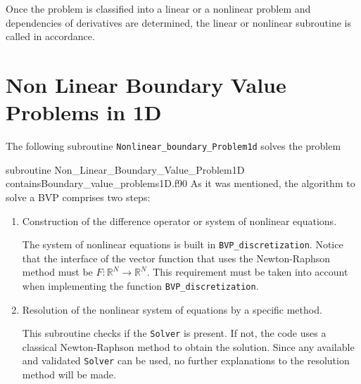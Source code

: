 Once the problem is classified into a linear or a nonlinear problem and dependencies of derivatives are determined, the linear or nonlinear subroutine is called in accordance. 




          
       
\newpage        
\section{Non Linear Boundary Value Problems in 1D}
The following  subroutine \verb|Nonlinear_boundary_Problem1d| solves the problem

       \vspace{1.0cm} 
                {subroutine Non_Linear_Boundary_Value_Problem1D}
                {contains}{Boundary_value_problems1D.f90}
As it was mentioned, the algorithm to solve a BVP comprises two steps: 
\begin{enumerate} 
\item Construction of the difference operator or system of nonlinear equations. 

The system of nonlinear equations is built in  \verb|BVP_discretization|. Notice that the interface of the vector function that uses the Newton-Raphson method must be 
${F}: \mathbb{R}^{N} \rightarrow \mathbb{R}^{N}$. This requirement must be taken into account when implementing 
the function \verb|BVP_discretization|.

\item Resolution of the nonlinear system of equations by a specific method. 
 
This subroutine checks if the \verb|Solver| is present. 
If not, the code uses a classical Newton-Raphson method to obtain the solution.
Since any available and validated \verb|Solver| can be used,  no further explanations to the resolution method will be made.

\end{enumerate}


